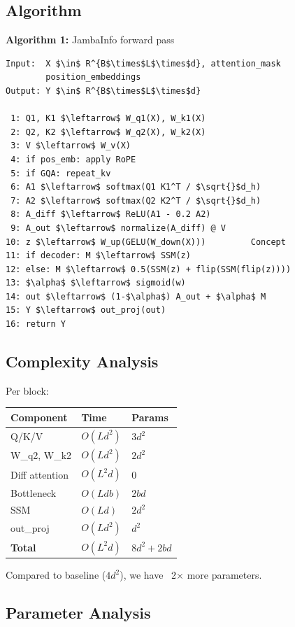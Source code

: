 \subsection{Algorithm}

\textbf{Algorithm 1:} JambaInfo forward pass
\begin{lstlisting}
Input:  X $\in$ R^{B$\times$L$\times$d}, attention_mask
        position_embeddings
Output: Y $\in$ R^{B$\times$L$\times$d}

 1: Q1, K1 $\leftarrow$ W_q1(X), W_k1(X)
 2: Q2, K2 $\leftarrow$ W_q2(X), W_k2(X)
 3: V $\leftarrow$ W_v(X)
 4: if pos_emb: apply RoPE
 5: if GQA: repeat_kv
 6: A1 $\leftarrow$ softmax(Q1 K1^T / $\sqrt{}$d_h)
 7: A2 $\leftarrow$ softmax(Q2 K2^T / $\sqrt{}$d_h)
 8: A_diff $\leftarrow$ ReLU(A1 - 0.2 A2)
 9: A_out $\leftarrow$ normalize(A_diff) @ V
10: z $\leftarrow$ W_up(GELU(W_down(X)))         Concept
11: if decoder: M $\leftarrow$ SSM(z)
12: else: M $\leftarrow$ 0.5(SSM(z) + flip(SSM(flip(z))))
13: $\alpha$ $\leftarrow$ sigmoid(w)
14: out $\leftarrow$ (1-$\alpha$) A_out + $\alpha$ M
15: Y $\leftarrow$ out_proj(out)
16: return Y
\end{lstlisting}

\subsection{Complexity Analysis}

Per block:

\begin{table}[H]
\centering
\small
\begin{tabular}{lll}
\toprule
\textbf{Component} & \textbf{Time} & \textbf{Params} \\
\midrule
Q/K/V & $O(L d^2)$ & $3 d^2$ \\
W\_q2, W\_k2 & $O(L d^2)$ & $2 d^2$ \\
Diff attention & $O(L^2 d)$ & 0 \\
Bottleneck & $O(L d b)$ & $2 b d$ \\
SSM & $O(L d)$ & $2 d^2$ \\
out\_proj & $O(L d^2)$ & $d^2$ \\
\textbf{Total} & $O(L^2 d)$ & $8 d^2 + 2bd$ \\
\bottomrule
\end{tabular}
\end{table}

Compared to baseline ($4 d^2$), we have ~2$\times$ more parameters.

\subsection{Parameter Analysis}

